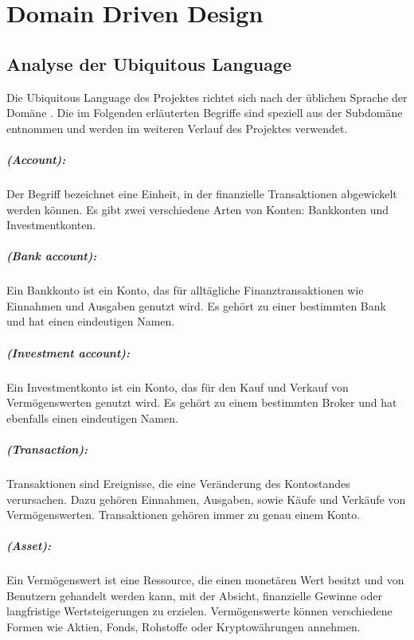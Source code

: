 \chapter{Domain Driven Design}
\section{Analyse der Ubiquitous Language}

Die Ubiquitous Language des Projektes richtet sich nach der üblichen Sprache der Domäne . Die im Folgenden erläuterten Begriffe sind speziell aus der Subdomäne  entnommen und werden im weiteren Verlauf des Projektes verwendet.

\paragraph*{ (Account):} Der Begriff bezeichnet eine Einheit, in der finanzielle Transaktionen abgewickelt werden können. Es gibt zwei verschiedene Arten von Konten: Bankkonten und Investmentkonten.

\paragraph*{ (Bank account):} Ein Bankkonto ist ein Konto, das für alltägliche Finanztransaktionen wie Einnahmen und Ausgaben genutzt wird. Es gehört zu einer bestimmten Bank und hat einen eindeutigen Namen.

\paragraph*{ (Investment account):}  Ein Investmentkonto ist ein Konto, das für den Kauf und Verkauf von Vermögenswerten genutzt wird. Es gehört zu einem bestimmten Broker und hat ebenfalls einen eindeutigen Namen.

\paragraph*{ (Transaction):} Transaktionen sind Ereignisse, die eine Veränderung des Kontostandes verursachen. Dazu gehören Einnahmen, Ausgaben, sowie Käufe und Verkäufe von Vermögenswerten. Transaktionen gehören immer zu genau einem Konto.

\paragraph*{ (Asset):} Ein Vermögenswert ist eine Ressource, die einen monetären Wert besitzt und von Benutzern gehandelt werden kann, mit der Absicht, finanzielle Gewinne oder langfristige Wertsteigerungen zu erzielen. Vermögenswerte können verschiedene Formen wie Aktien, Fonds, Rohstoffe oder Kryptowährungen annehmen.

